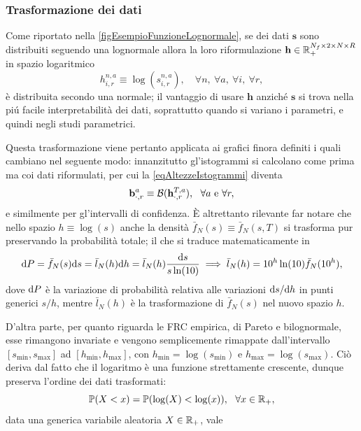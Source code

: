       \subsubsection{Trasformazione dei dati}

        Come riportato nella \cref{figEsempioFunzioneLognormale}, se dei dati \(\mathbf s\) sono distribuiti seguendo una lognormale allora la loro riformulazione \(\mathbf h\in\mathbb R_+^{N_f\times2\times N\times R}\) in spazio logaritmico
        \begin{equation*}
          h_{i,r}^{n,a}\equiv\log(s_{i,r}^{n,a}),
          \quad\forall n,\ \forall a,\ \forall i,\ \forall r,
        \end{equation*}
        è distribuita secondo una normale; il vantaggio di usare \(\mathbf h\) anziché \(\mathbf s\) si trova nella piú facile interpretabilità dei dati, soprattutto quando si variano i parametri, e quindi negli studi parametrici.

        Questa trasformazione viene pertanto applicata ai grafici finora definiti i quali cambiano nel seguente modo: innanzitutto gl'istogrammi si calcolano come prima ma coi dati riformulati, per cui la \cref{eqAltezzeIstogrammi} diventa
        \begin{equation*}
          \mathbf b^a_{\cdot,r}\equiv\operatorname{\mathcal B}(\mathbf h^{T,a}_{\cdot,r}),
          \ \ \forall a\text{ e }\forall r,
        \end{equation*}
        e similmente per gl'intervalli di confidenza. È altrettanto rilevante far notare che nello spazio \(h\equiv\log(s)\) anche la densità \(\bar f_N(s)\equiv\bar f_N(s,T)\) si trasforma\footnotemark{} pur preservando la probabilità totale; il che si traduce matematicamente in%
        \[
          \mathrm{d} P=\bar f_N(s)\mathrm{d} s
          =\bar l_N(h)\mathrm{d} h
          =\bar l_N(h)\frac{\mathrm{d} s}{s\ln(10)}
          \implies
          \bar l_N(h)=10^h\ln(10)\bar f_N(10^h),
        \]
        dove \(\mathrm{d} P\) è la variazione di probabilità relativa alle variazioni \(\mathrm{d} s/\mathrm{d} h\) in punti generici \(s/h\), mentre \(\bar l_N(h)\) è la trasformazione di \(\bar f_N(s)\) nel nuovo spazio \(h\).

        D'altra parte, per quanto riguarda le FRC empirica, di Pareto e bilognormale, esse rimangono invariate e vengono semplicemente rimappate dall'intervallo \([s_{\min},s_{\max}]\) ad \([h_{\min},h_{\max}]\), con \(h_{\min}=\log(s_{\min})\) e \(h_{\max}=\log(s_{\max})\). Ciò deriva dal fatto che il logaritmo è una funzione strettamente crescente, dunque preserva l'ordine dei dati trasformati:
        \begin{equation*}
          \mathbb P(X<x)=\mathbb P(\log(X)<\log(x)),\ \ \forall x\in\RPlus,
        \end{equation*}
        data una generica variabile aleatoria \(X\in\mathbb R_+\), vale


